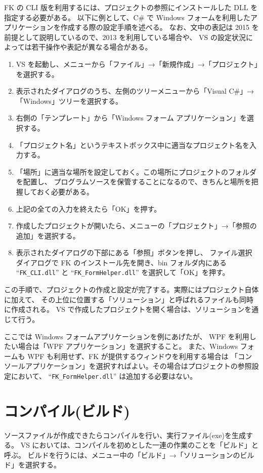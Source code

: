 \documentclass[a4j]{jarticle}
\begin{document}
FK の CLI 版を利用するには、プロジェクトの参照にインストールした DLL を指定する必要がある。
以下に例として、C\# で Windows フォームを利用したアプリケーションを作成する際の設定手順を述べる。
なお、文中の表記は 2015 を前提として説明しているので、2013 を利用している場合や、
VS の設定状況によっては若干操作や表記が異なる場合がある。

\begin{enumerate}
 \item VS を起動し、メニューから「ファイル」→「新規作成」→「プロジェクト」を選択する。
 \item 表示されたダイアログのうち、左側のツリーメニューから「Visual C\#」→「Windows」ツリーを選択する。
 \item 右側の「テンプレート」から「Windows フォーム アプリケーション」を選択する。
 \item 「プロジェクト名」というテキストボックス中に適当なプロジェクト名を入力する。
 \item 「場所」に適当な場所を設定しておく。この場所にプロジェクトのフォルダを配置し、
	プログラムソースを保管することになるので、きちんと場所を把握しておく必要がある。
 \item 上記の全ての入力を終えたら「OK」を押す。
 \item 作成したプロジェクトが開いたら、メニューの「プロジェクト」→「参照の追加」を選択する。
 \item 表示されたダイアログの下部にある「参照」ボタンを押し、
 	ファイル選択ダイアログで FK のインストール先を開き、bin フォルダ内にある
 	``\verb+FK_CLI.dll+'' と ``\verb+FK_FormHelper.dll+'' を選択して「OK」を押す。
\end{enumerate}

この手順で、プロジェクトの作成と設定が完了する。実際にはプロジェクト自体に加えて、
その上位に位置する「ソリューション」と呼ばれるファイルも同時に作成される。
VS で作成したプロジェクトを開く場合は、ソリューションを通じて行う。

ここでは Windows フォームアプリケーションを例にあげたが、
WPF を利用したい場合は「WPF アプリケーション」を選択すること。
また、Windows フォームも WPF も利用せず、FK が提供するウィンドウを利用する場合は
「コンソールアプリケーション」を選択すればよい。その場合はプロジェクトの参照設定において、
``\verb+FK_FormHelper.dll+'' は追加する必要はない。


\section{コンパイル(ビルド)}
ソースファイルが作成できたらコンパイルを行い、実行ファイル(exe)を生成する。
VS においては、コンパイルを初めとした一連の作業のことを「ビルド」と呼ぶ。
ビルドを行うには、メニュー中の「ビルド」→「ソリューションのビルド」を選択する。
\end{document}
